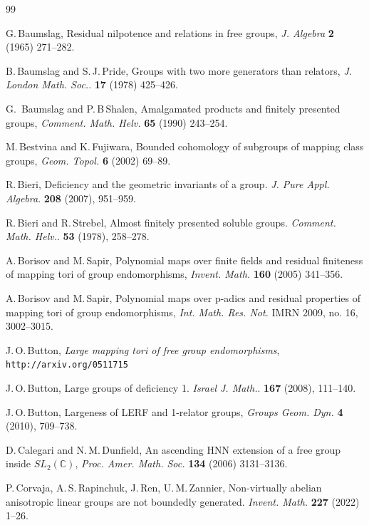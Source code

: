 \documentclass[11pt,reqno]{amsart}
\numberwithin{equation}{section}
\newcommand{\Cc}{\mathbb{C}}
\theoremstyle{definition}
\theoremstyle{remark}
\begin{document}
\begin{thebibliography}{99}

 G.\,Baumslag,
  Residual nilpotence and relations in free groups,
  {\it J. Algebra} {\bf 2} (1965) 271--282.
  
 B.\,Baumslag and S.\,J.\,Pride,
Groups with two more generators than relators,
{\it J. London Math. Soc.}. {\bf 17} (1978) 425--426.


 G.\, Baumslag and P.\,B\,Shalen,
Amalgamated products and finitely presented groups,
{\it Comment. Math. Helv.} {\bf 65} (1990) 243--254. 
  
 M.\,Bestvina and K.\,Fujiwara,
  Bounded cohomology of subgroups of mapping class groups,
  {\it Geom. Topol.} {\bf 6} (2002) 69--89. 
  
 R.\,Bieri,
Deficiency and the geometric invariants of a group.
{\it J. Pure Appl. Algebra}. {\bf 208} (2007), 951--959.

 R.\,Bieri and R.\,Strebel,
Almost finitely presented soluble groups.
{\it Comment. Math. Helv.}. {\bf 53} (1978), 258--278.

 A.\,Borisov and M.\,Sapir,
Polynomial maps over finite fields and residual finiteness of mapping
tori of group endomorphisms,
{\it Invent. Math.} {\bf 160} (2005) 341--356.

  A.\,Borisov and M.\,Sapir,
  Polynomial maps over p-adics and residual properties of mapping tori
  of group endomorphisms, {\it Int. Math. Res. Not.}
  IMRN 2009, no. 16, 3002--3015.

 J.\,O.\,Button,
{\it Large mapping tori of free group endomorphisms},
\texttt{http://arxiv.org/0511715}

  
 J.\,O.\,Button,
Large groups of deficiency 1.
{\it Israel J. Math.}. {\bf 167} (2008), 111--140.

 J.\,O.\,Button,
Largeness of LERF and 1-relator groups,
{\it Groups Geom. Dyn.} {\bf 4} (2010), 709--738.

 D.\,Calegari and N.\,M.\,Dunfield,
  An ascending HNN extension of a free group inside $SL_2(\Cc)$,
  {\it Proc. Amer. Math. Soc.} {\bf 134} (2006) 3131--3136. 

 P.\,Corvaja, A.\,S.\,Rapinchuk, J.\,Ren, U.\,M.\,Zannier,
  Non-virtually abelian anisotropic linear groups are not boundedly generated.
  {\it Invent. Math.} {\bf 227} (2022) 1--26. 


\end{thebibliography}
\end{document}
